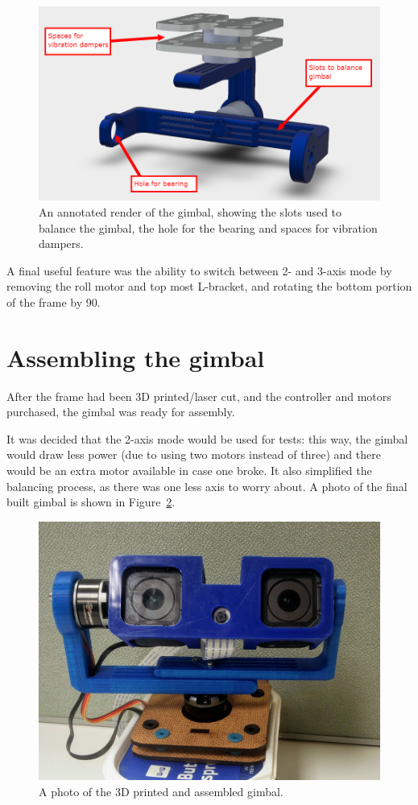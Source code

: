 \begin{figure}[h!]
    \centering
    \includegraphics[width=0.8\linewidth]{methodology/annotated_assembly_no_cams}
    \caption{\label{fig:annotated_assembly_no_cams}An annotated render of the gimbal, showing the slots used to balance the gimbal, the hole for the bearing and spaces for vibration dampers.}
\end{figure}

A final useful feature was the ability to switch between 2- and 3-axis mode by removing the roll motor and top most L-bracket, and rotating the bottom portion of the frame by 90\textdegree.

\section{Assembling the gimbal}
After the frame had been 3D printed/laser cut, and the controller and motors purchased, the gimbal was ready for assembly.

It was decided that the 2-axis mode would be used for tests: this way, the gimbal would draw less power (due to using two motors instead of three) and there would be an extra motor available in case one broke. It also simplified the balancing process, as there was one less axis to worry about. A photo of the final built gimbal is shown in Figure~\ref{fig:photo_of_gimbal}.

\begin{figure}[h!]
    \centering
    \includegraphics[width=0.8\linewidth]{methodology/photo_of_gimbal}
    \caption{\label{fig:photo_of_gimbal}A photo of the 3D printed and assembled gimbal.}
\end{figure}

